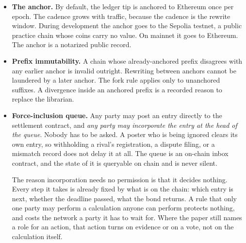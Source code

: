 \documentclass[11pt]{article}
\begin{document}
\begin{itemize}
          Two separate authorities can name the librarian, and keeping them
          separate is what makes the replacement rule real. The developer's
          key names it during bootstrap and then closes. A governance
          executor names it thereafter, holds that one power and no other,
          and can hand itself on to a successor. A single authority would
          have to choose between two failures: keep the developer's key
          alive and the network never retires it, or close the developer's
          key and the librarian address freezes at whoever last held it,
          with a two-thirds vote deciding something it has no way to carry
          out.
    \item \textbf{The anchor.} By default, the ledger tip is anchored
          to Ethereum once per epoch. The cadence grows with traffic,
          because the cadence is the rewrite window. During development the
          anchor goes to the Sepolia testnet, a public practice chain whose
          coins carry no value. On mainnet it goes to Ethereum. The anchor
          is a notarized public record.
    \item \textbf{Prefix immutability.} A chain whose already-anchored
          prefix disagrees with any earlier anchor is invalid outright.
          Rewriting between anchors cannot be laundered by a later anchor.
          The fork rule applies only to unanchored suffixes. A divergence
          inside an anchored prefix is a recorded reason to replace the
          librarian.
    \item \textbf{Force-inclusion queue.} Any party may post an
          entry directly to the settlement contract, and \emph{any party may
              incorporate the entry at the head of the queue}. Nobody has to be
          asked. A poster who is being ignored clears its own entry, so
          withholding a rival's registration, a dispute filing, or a mismatch
          record does not delay it at all. The queue is an on-chain inbox
          contract, and the state of it is queryable on chain and is never silent.

          The reason incorporation needs no permission is that it decides
          nothing. Every step it takes is already fixed by what is on the chain:
          which entry is next, whether the deadline passed, what the bond
          returns. A rule that only one party may perform a
          calculation anyone can perform protects nothing, and costs the
          network a party it has to wait for. Where the paper still names a
          role for an action, that action turns on evidence or on a vote, not
          on the calculation itself.


\end{itemize}
\end{document}
